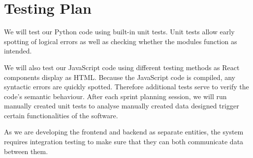 \documentclass[11pt, oneside, a4paper]{article}
\begin{document}
\section{Testing Plan}
We will test our Python code using built-in unit tests. Unit tests allow early
spotting of logical errors as well as checking whether the modules function as
intended.

We will also test our JavaScript code using different testing methods as React
components display as HTML. Because the JavaScript code is compiled, any syntactic
errors are quickly spotted. Therefore additional tests serve to verify the code’s
semantic behaviour. After each sprint planning session, we will run manually
created unit tests to analyse manually created data designed trigger certain
functionalities of the software.

As we are developing the frontend and backend as separate entities, the system
requires integration testing to make sure that they can both communicate data
between them.
\end{document}
